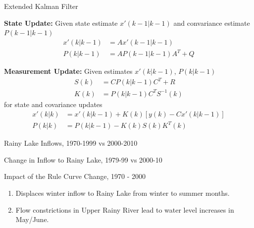 \documentclass[compress,english]{beamer}
\begin{document}
\begin{frame}{Extended Kalman Filter}

{\bf State Update:} Given state estimate $x'(k-1|k-1)$ and convariance estimate $P(k-1|k-1)$
\begin{align*}
x'(k|k-1) & = A x'(k-1|k-1) \\
P(k|k-1) & = A P(k-1|k-1) A^T + Q
\end{align*}

{\bf Measurement Update:} Given estimates $x'(k|k-1)$, $P(k|k-1)$
\begin{align*}
S(k) & = CP(k|k-1)C^T + R \\
K(k) & = P(k|k-1)C^TS^{-1}(k)
\end{align*}
for state and covariance updates
\begin{align*}
x'(k|k) & = x'(k|k-1) + K(k)\left[y(k) - C x'(k|k-1)\right] \\
P(k|k) & = P(k|k-1) - K(k)S(k)K^T(k)
\end{align*}
\end{frame}

\begin{frame}{Rainy Lake Inflows, 1970-1999 vs 2000-2010}

\begin{center}
\end{center}

\end{frame}

\begin{frame}{Change in Inflow to Rainy Lake, 1979-99 vs 2000-10}

\begin{center}
\end{center}

\end{frame}

\begin{frame}{Impact of the Rule Curve Change, 1970 - 2000}

\begin{enumerate}
\item Displaces winter inflow to Rainy Lake from winter to summer months.
\item Flow constrictions in Upper Rainy River lead to water level increases in May/June.
\end{enumerate}

\end{frame}
\end{document}
